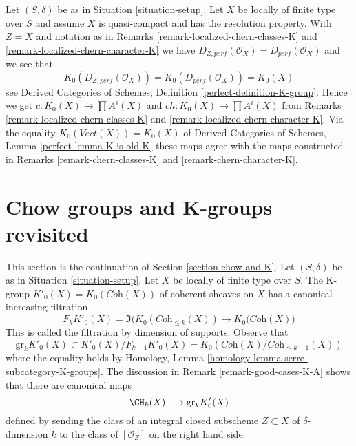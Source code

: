 \begin{remark}
\label{remark-chern-classes-agree}
Let $(S, \delta)$ be as in Situation \ref{situation-setup}.
Let $X$ be locally of finite type over $S$ and assume $X$
is quasi-compact and has the resolution property.
With $Z = X$ and notation as in
Remarks \ref{remark-localized-chern-classes-K} and
\ref{remark-localized-chern-character-K}
we have $D_{Z, perf}(\mathcal{O}_X) = D_{perf}(\mathcal{O}_X)$
and we see that
$$
K_0(D_{Z, perf}(\mathcal{O}_X)) = K_0(D_{perf}(\mathcal{O}_X)) = K_0(X)
$$
see 
Derived Categories of Schemes, Definition \ref{perfect-definition-K-group}.
Hence we get
$c : K_0(X) \to \prod A^i(X)$ and $ch : K_0(X) \to \prod A^i(X)$ from
Remarks \ref{remark-localized-chern-classes-K} and
\ref{remark-localized-chern-character-K}.
Via the equality $K_0(\textit{Vect}(X)) = K_0(X)$ of
Derived Categories of Schemes, Lemma \ref{perfect-lemma-K-is-old-K}
these maps agree with the maps constructed in
Remarks \ref{remark-chern-classes-K} and
\ref{remark-chern-character-K}.
\end{remark}











\section{Chow groups and K-groups revisited}
\label{section-chow-and-K-II}

\noindent
This section is the continuation of Section \ref{section-chow-and-K}.
Let $(S, \delta)$ be as in Situation \ref{situation-setup}.
Let $X$ be locally of finite type over $S$. The K-group
$K'_0(X) = K_0(\textit{Coh}(X))$ of coherent sheaves on $X$
has a canonical increasing filtration
$$
F_kK'_0(X) =
\Im\Big(K_0(\textit{Coh}_{\leq k}(X)) \to K_0(\textit{Coh}(X)\Big)
$$
This is called the filtration by dimension of supports. Observe that
$$
\text{gr}_k K'_0(X) \subset K'_0(X)/F_{k - 1}K'_0(X) =
K_0(\textit{Coh}(X)/\textit{Coh}_{\leq k - 1}(X))
$$
where the equality holds
by Homology, Lemma \ref{homology-lemma-serre-subcategory-K-groups}.
The discussion in Remark \ref{remark-good-cases-K-A} shows
that there are canonical maps
$$
\CH_k(X) \longrightarrow \text{gr}_k K'_0(X)
$$
defined by sending the class of an integral closed subscheme
$Z \subset X$ of $\delta$-dimension $k$ to the class of
$[\mathcal{O}_Z]$ on the right hand side.

